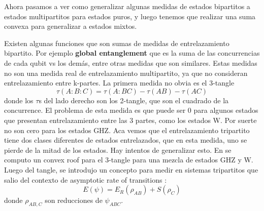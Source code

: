 Ahora pasamos a ver como generalizar algunas medidas de estados bipartitos a estados multipartitos para estados puros, y luego tenemos que realizar una suma convexa para generalizar a estados mixtos. 

Existen algunas funciones que son sumas de medidas de entrelazamiento bipartito. Por ejemplo \textbf{global entanglement} \cite{MeyerWallach2001} que es la suma de las concurrencias de cada qubit vs los demás, entre otras medidas que son similares. Estas medidas no son una medida real de entrelazamiento multipartito, ya que no consideran entrelazamiento entre k-partes. La primera medida no obvia es el 3-tangle \cite{Coffman2000} 
\begin{equation}
    \tau(A:B:C)=\tau(A:BC)-\tau(AB)-\tau(AC)
\end{equation}
donde los $\tau$s del lado derecho son los 2-tangle, que son el cuadrado de la concurrence. El problema de esta medida es que puede ser 0 para algunos estados que presentan entrelazamiento entre las 3 partes, como los estados W. Por suerte no son cero para los estados GHZ. Aca vemos que el entrelazamiento tripartito tiene dos clases diferentes de estados entrelazados, que en esta medida, uno se pierde de la mitad de los estados. Hay intentos de generalizar esto. En \cite{Lohmayer2006} se computo un convex roof para el 3-tangle para una mezcla de estados GHZ y W. Luego del tangle, se introdujo un concepto para medir en sistemas tripartitos que salio del contexto de asymptotic rate of transitions \cite{Linden1999a}:
\begin{equation}
    E(\psi)=E_R(\rho_{AB})+S(\rho_C)
\end{equation}
donde $\rho_{AB,C}$ son reducciones de $\psi_{ABC}$.


